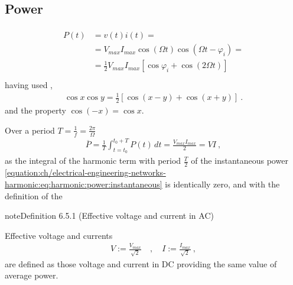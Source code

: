\documentclass[letterpaper,10pt,english]{jupyterBook}
\begin{document}
\subsection{Power}
\label{\detokenize{ch/electrical-engineering-networks-harmonic:power}}\label{\detokenize{ch/electrical-engineering-networks-harmonic:classical-electromagnetism-electrical-engineering-newtork-analysis-harmonic-power}}
\sphinxAtStartPar
{}
\begin{equation}\label{equation:ch/electrical-engineering-networks-harmonic:eq:harmonic:power:instantaneous}
\begin{split}\begin{aligned}
  P(t) 
  & = v(t) i(t) = \\
  & = V_{max} I_{max}  \cos (\Omega t )  \cos (\Omega t - \varphi_i) = \\ 
  & = \frac{1}{2} V_{max} I_{max} \left[ \cos \varphi_i +  \cos ( 2 \Omega t ) \right]  \\ 
\end{aligned}\end{split}
\end{equation}
\sphinxAtStartPar
having used ,
\begin{equation*}
\begin{split}\cos x \cos y = \frac{1}{2} \left[ \cos(x-y) + \cos(x+y) \right] \ .\end{split}
\end{equation*}
\sphinxAtStartPar
and the property \(\cos(-x) = \cos x\).

\sphinxAtStartPar
{} Over a period \(T = \frac{1}{f} = \frac{2 \pi}{\Omega}\)
\begin{equation*}
\begin{split}\overline{P} = \frac{1}{T} \int_{t=t_0}^{t_0+T} P(t) \, dt = \frac{V_{max} I_{max}}{2} = V I\ ,\end{split}
\end{equation*}
\sphinxAtStartPar
as the integral of the harmonic term with period \(\frac{T}{2}\) of the instantaneous power \eqref{equation:ch/electrical-engineering-networks-harmonic:eq:harmonic:power:instantaneous} is identically zero, and with the definition of the 
\label{ch/electrical-engineering-networks-harmonic:harmonic:effective-values}
\begin{sphinxadmonition}{note}{Definition 6.5.1 (Effective voltage and current in AC)}



\sphinxAtStartPar
Effective voltage and currents
\begin{equation*}
\begin{split}V := \frac{V_{max}}{\sqrt{2}} \quad , \quad I := \frac{I_{max}}{\sqrt{2}} \ , \end{split}
\end{equation*}
\sphinxAtStartPar
are defined as those voltage and current in DC providing the same value of average power.
\end{sphinxadmonition}
\end{document}
